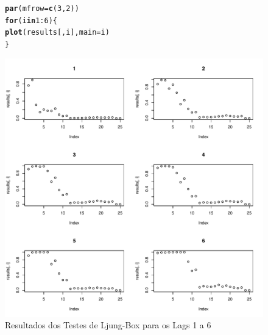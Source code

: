 \documentclass{article}\usepackage[]{graphicx}\usepackage[]{color}
\makeatletter
\def\maxwidth{ %
  \ifdim\Gin@nat@width>\linewidth
    \linewidth
  \else
    \Gin@nat@width
  \fi
}
\newcommand{\hlnum}[1]{\textcolor[rgb]{0.686,0.059,0.569}{#1}}%
\newcommand{\hlopt}[1]{\textcolor[rgb]{0,0,0}{#1}}%
\newcommand{\hlstd}[1]{\textcolor[rgb]{0.345,0.345,0.345}{#1}}%
\newcommand{\hlkwa}[1]{\textcolor[rgb]{0.161,0.373,0.58}{\textbf{#1}}}%
\newcommand{\hlkwc}[1]{\textcolor[rgb]{0.333,0.667,0.333}{#1}}%
\newcommand{\hlkwd}[1]{\textcolor[rgb]{0.737,0.353,0.396}{\textbf{#1}}}%
\newenvironment{kframe}{%
 \def\at@end@of@kframe{}%
 \ifinner\ifhmode%
  \def\at@end@of@kframe{\end{minipage}}%
  \begin{minipage}{\columnwidth}%
 \fi\fi%
 \def\FrameCommand##1{\hskip\@totalleftmargin \hskip-\fboxsep
 \colorbox{shadecolor}{##1}\hskip-\fboxsep
     \hskip-\linewidth \hskip-\@totalleftmargin \hskip\columnwidth}%
 \MakeFramed {\advance\hsize-\width
   \@totalleftmargin\z@ \linewidth\hsize
   \@setminipage}}%
 {\par\unskip\endMakeFramed%
 \at@end@of@kframe}
\newenvironment{knitrout}{}{} %
\makeatother
\begin{document}
            \begin{figure}[H]
            \caption{Resultados dos Testes de Ljung-Box para os Lags 1 a 6}
            \centering
\begin{knitrout}
\color{fgcolor}\begin{kframe}
\begin{alltt}
\hlkwd{par}\hlstd{(}\hlkwc{mfrow} \hlstd{=} \hlkwd{c}\hlstd{(}\hlnum{3}\hlstd{,}\hlnum{2}\hlstd{))}
\hlkwa{for} \hlstd{(i} \hlkwa{in} \hlnum{1}\hlopt{:}\hlnum{6}\hlstd{)\{}
  \hlkwd{plot}\hlstd{(results[,i],} \hlkwc{main}\hlstd{=i)}
\hlstd{\}}
\end{alltt}
\end{kframe}
\includegraphics[width=\maxwidth]{figure/unnamed-chunk-46-1} 

\end{knitrout}
            \end{figure}
            
\end{document}
